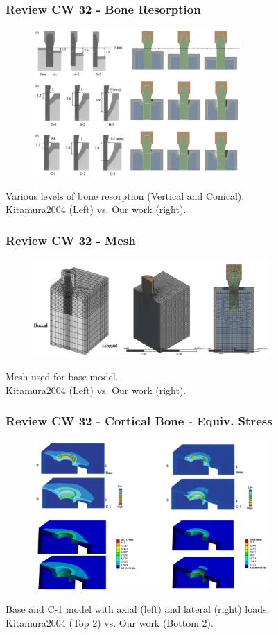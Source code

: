 \begin{frame}
  \frametitle{Review CW 32 - Bone Resorption}
	\begin{figure}
		\includegraphics[width=0.7\textwidth]{pictures/CW32_2}
	\end{figure}
	\centering Various levels of bone resorption (Vertical and Conical). \\
	\centering Kitamura2004 (Left) vs. Our work (right).
\end{frame}

\begin{frame}
  \frametitle{Review CW 32 - Mesh}
	\begin{figure}
		\includegraphics[width=0.8\textwidth]{pictures/CW32_3}
	\end{figure}
	\centering Mesh used for base model. \\
	\centering Kitamura2004 (Left) vs. Our work (right).
\end{frame}

\begin{frame}
  \frametitle{Review CW 32 - Cortical Bone - Equiv. Stress}
	\begin{figure}
		\includegraphics[width=0.8\textwidth]{pictures/CW32_4}
	\end{figure}
	\centering Base and C-1 model with axial (left) and lateral (right) loads. \\
	\centering Kitamura2004 (Top 2) vs. Our work (Bottom 2).
\end{frame}

